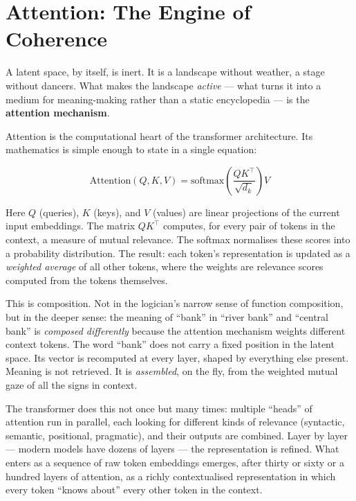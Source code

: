 \documentclass[12pt,a4paper]{article}
\begin{document}
\section{Attention: The Engine of Coherence}

A latent space, by itself, is inert. It is a landscape without weather, a stage without dancers. What makes the landscape \emph{active} --- what turns it into a medium for meaning-making rather than a static encyclopedia --- is the \textbf{attention mechanism}.

Attention is the computational heart of the transformer architecture. Its mathematics is simple enough to state in a single equation:

\begin{equation}\label{eq:attention}
\text{Attention}(Q, K, V) = \text{softmax}\!\left(\frac{QK^\top}{\sqrt{d_k}}\right) V
\end{equation}

Here $Q$ (queries), $K$ (keys), and $V$ (values) are linear projections of the current input embeddings. The matrix $QK^\top$ computes, for every pair of tokens in the context, a measure of mutual relevance. The softmax normalises these scores into a probability distribution. The result: each token's representation is updated as a \emph{weighted average} of all other tokens, where the weights are relevance scores computed from the tokens themselves.

This is composition. Not in the logician's narrow sense of function composition, but in the deeper sense: the meaning of ``bank'' in ``river bank'' and ``central bank'' is \emph{composed differently} because the attention mechanism weights different context tokens. The word ``bank'' does not carry a fixed position in the latent space. Its vector is recomputed at every layer, shaped by everything else present. Meaning is not retrieved. It is \emph{assembled}, on the fly, from the weighted mutual gaze of all the signs in context.

The transformer does this not once but many times: multiple ``heads'' of attention run in parallel, each looking for different kinds of relevance (syntactic, semantic, positional, pragmatic), and their outputs are combined. Layer by layer --- modern models have dozens of layers --- the representation is refined. What enters as a sequence of raw token embeddings emerges, after thirty or sixty or a hundred layers of attention, as a richly contextualised representation in which every token ``knows about'' every other token in the context.
\end{document}

